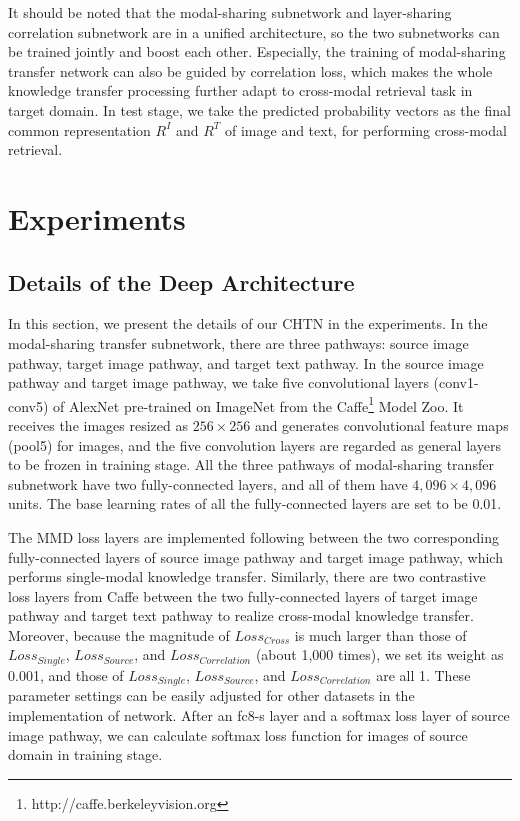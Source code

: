 \documentclass{article}
\begin{document}
It should be noted that the modal-sharing subnetwork and layer-sharing correlation subnetwork are in a unified architecture, so the two subnetworks can be trained jointly and boost each other. Especially, the training of modal-sharing transfer network can also be guided by correlation loss, which makes the whole knowledge transfer processing further adapt to cross-modal retrieval task in target domain. In test stage, we take the predicted probability vectors as the final common representation $R^{I}$ and $R^{T}$ of image and text, for performing cross-modal retrieval.









\section{Experiments}

\subsection{Details of the Deep Architecture}

In this section, we present the details of our CHTN in the experiments. 
In the modal-sharing transfer subnetwork, there are three pathways: source image pathway, target image pathway, and target text pathway. In the source image pathway and target image pathway, we take five convolutional layers (conv1-conv5) of AlexNet \cite{DBLP:conf/nips/KrizhevskySH12} pre-trained on ImageNet from the Caffe\footnote{http://caffe.berkeleyvision.org} Model Zoo. It receives the images resized as $256 \times 256$ and generates convolutional feature maps (pool5) for images, and the five convolution layers are regarded as general layers to be frozen in training stage. All the three pathways of modal-sharing transfer subnetwork have two fully-connected layers, and all of them have $4,096 \times 4,096$ units. The base learning rates of all the fully-connected layers are set to be 0.01.

The MMD loss layers are implemented following \cite{DBLP:conf/icml/LongC0J15} between the two corresponding fully-connected layers of source image pathway and target image pathway, which performs single-modal knowledge transfer. Similarly, there are two contrastive loss layers from Caffe between the two fully-connected layers of target image pathway and target text pathway to realize cross-modal knowledge transfer. Moreover, because the magnitude of $Loss_{Cross}$ is much larger than those of $Loss_{Single}$, $Loss_{Source}$, and $Loss_{Correlation}$ (about 1,000 times), we set its weight as 0.001, and those of  $Loss_{Single}$, $Loss_{Source}$, and $Loss_{Correlation}$ are all 1. These parameter settings can be easily adjusted for other datasets in the implementation of network. After an fc8-s layer and a softmax loss layer of source image pathway, we can calculate softmax loss function for images of source domain in training stage. 
\end{document}
